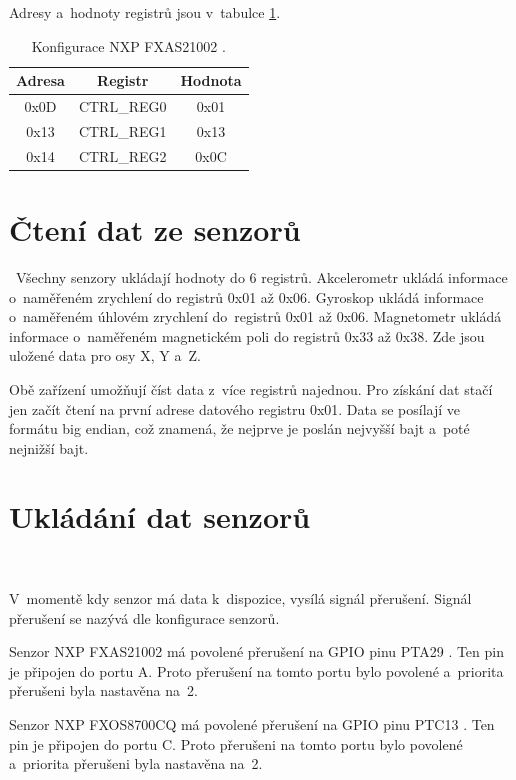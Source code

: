 Adresy a~hodnoty registrů jsou v~tabulce \ref{tab:FXAS21002}.

\begin{table}[!h]
    \centering
    \begin{tabular}{ccc}
        \hline
        \textbf{Adresa} & \textbf{Registr} & \textbf{Hodnota} \\
        \hline
        0x0D            & CTRL\_REG0       & 0x01             \\
        0x13            & CTRL\_REG1       & 0x13             \\
        0x14            & CTRL\_REG2       & 0x0C             \\
        \hline
    \end{tabular}
    \caption{Konfigurace NXP FXAS21002 \cite{FXAS21002}.}
    \label{tab:FXAS21002}
\end{table}

\section{Čtení dat ze senzorů}\
Všechny senzory ukládají hodnoty do 6 registrů. Akcelerometr ukládá informace
o~naměřeném zrychlení do registrů 0x01 až 0x06. Gyroskop ukládá informace 
o~naměřeném úhlovém zrychlení do~registrů 0x01 až 0x06. Magnetometr ukládá 
informace o~naměřeném magnetickém poli do registrů 0x33 až 0x38. Zde jsou 
uložené data pro osy X, Y a~Z.

Obě zařízení umožňují číst data z~více registrů najednou. Pro získání dat stačí jen
začít čtení na první adrese datového registru 0x01. Data se posílají ve formátu big
endian, což znamená, že nejprve je poslán nejvyšší bajt a~poté nejnižší bajt.

\section{Ukládání dat senzorů}\

V~momentě kdy senzor má data k~dispozice, vysílá signál přerušení. 
Signál přerušení se nazývá \uv{Data Ready} dle konfigurace senzorů. 

Senzor NXP FXAS21002 má povolené přerušení na GPIO pinu PTA29 
\cite{frdmk66UserGuide}. Ten pin je připojen do portu A. Proto přerušení na tomto 
portu bylo povolené a~priorita přerušeni byla nastavěna na~2.

Senzor NXP FXOS8700CQ má povolené přerušení na GPIO pinu PTC13 
\cite{frdmk66UserGuide}. Ten pin je připojen do portu C. Proto přerušeni na tomto 
portu bylo povolené a~priorita přerušeni byla nastavěna na~2.

